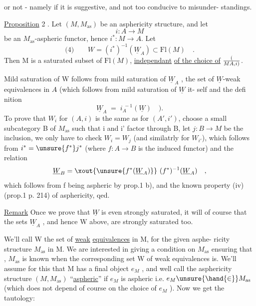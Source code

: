 
or not  -  namely if it is suggestive,  and not too conducive to misunder-%
standings.

\uline{Proposition} 2 .  Let $(M,M_{\mathrm{as}})$ be an asphericity structure,  and let
\[ i\colon A \to M \]
be an $M_{\mathrm{as}}$-aspheric functor,  hence $i^{*}\colon M \to A\hat{}$.  Let
\[ \text{(4)} \qquad W =(i^{*})^{-1}(\underline{W}_A) \subset \mathrm{Fl}(M) \quad . \]
Then M is a  saturated subset of $\mathrm{Fl}(M)$,  \uline{independant} \uline{of the choice of} $(\over{M}{A},i)$.

Mild saturation of W follows from mild saturation of $\underline{W}_A$ ,  the set
of $\underline{W}$-weak equivalences in $A\hat{}$ (which follows from mild saturation of $\underline{W}$ it-%
self and the defi nition
\[ \underline{W}_A \;=\; i_A^{\;-1}(\underline{W}) \quad ). \]
To prove that $W_i$ for $(A,i)$ is the same as  for $(A',i')$,  choose a small
 subcategory B of $M_{\mathrm{as}}$ such that i and i' factor through  B,  let $j\colon B \to M$
be the inclusion,  we only have to check $W_i = W_j$  (and similatrly for $W_{i'}$),
which follows from  $i^{*} = \unsure{f^{*}}j^{*}$  (where $f\colon A \to B$ is the induced functor)
and the relation
\[ \underline{W}_B = \xout{\unsure{f^{*}(\underline{W}_A)}}\ (f^{*})^{-1}(\underline{W}_A) \quad , \]
which follows from f being aspheric by prop.1 b),  and the known property
(iv) (prop.1\hand{,} p. 214) of asphericity,  qed.

\uline{Remark}  Once we prove that $\underline{W}$  is even strongly saturated,  it will 
of course that the sets $\underline{W}_A$ ,  and hence W above,  are strongly saturated
too.

We'll call W the set of \uline{weak} \uline{equivalences} in M,  for the given asphe-%
ricity structure $M_{\mathrm{as}}$ in M.  We are interested  in giving a condition on $M_{\mathrm{as}}$
ensuring that ,  $M_{\mathrm{as}}$ is known when the corresponding set W of
weak equivalences is.  We'll  assume for this that M has a
final object $e_M$ ,  and well call the asphericity structure $(M,M_{\mathrm{as}})$
``\uline{aspheric}''  if  $e_M$ is aspheric i.e.  $e_M \unsure{\hand{\in}} M_{\mathrm{as}}$  (which does not depend of
course on the choice of $e_M$ ).  Now we get the tautology:

